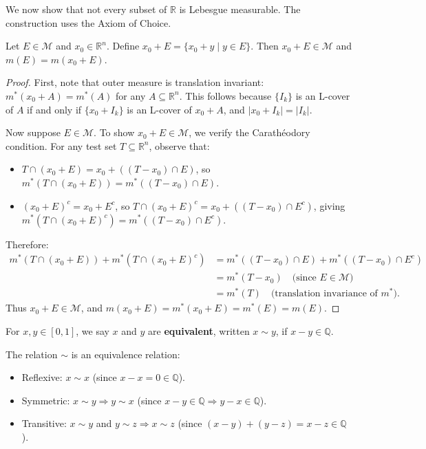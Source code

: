 \documentclass[11pt]{report}
\begin{document}
We now show that not every subset of $\mathbb{R}$ is Lebesgue measurable. The construction uses the Axiom of Choice.

\begin{lembox}
Let $E \in \mathcal{M}$ and $x_0 \in \mathbb{R}^n$. Define $x_0 + E = \{x_0 + y \mid y \in E\}$. Then $x_0 + E \in \mathcal{M}$ and $m(E) = m(x_0 + E)$.
\end{lembox}

\begin{proof}
First, note that outer measure is translation invariant: $m^*(x_0 + A) = m^*(A)$ for any $A \subseteq \mathbb{R}^n$. This follows because $\{I_k\}$ is an L-cover of $A$ if and only if $\{x_0 + I_k\}$ is an L-cover of $x_0 + A$, and $|x_0 + I_k| = |I_k|$.

Now suppose $E \in \mathcal{M}$. To show $x_0 + E \in \mathcal{M}$, we verify the Carath\'{e}odory condition. For any test set $T \subseteq \mathbb{R}^n$, observe that:
\begin{itemize}
    \item $T \cap (x_0 + E) = x_0 + ((T - x_0) \cap E)$, so $m^*(T \cap (x_0 + E)) = m^*((T - x_0) \cap E)$.
    \item $(x_0 + E)^c = x_0 + E^c$, so $T \cap (x_0 + E)^c = x_0 + ((T - x_0) \cap E^c)$, giving $m^*(T \cap (x_0 + E)^c) = m^*((T - x_0) \cap E^c)$.
\end{itemize}

Therefore:
\begin{align*}
m^*(T \cap (x_0 + E)) + m^*(T \cap (x_0 + E)^c) &= m^*((T - x_0) \cap E) + m^*((T - x_0) \cap E^c) \\
&= m^*(T - x_0) \quad \text{(since } E \in \mathcal{M}) \\
&= m^*(T) \quad \text{(translation invariance of } m^*).
\end{align*}
Thus $x_0 + E \in \mathcal{M}$, and $m(x_0 + E) = m^*(x_0 + E) = m^*(E) = m(E)$.
\end{proof}

\begin{defbox}
For $x, y \in [0, 1]$, we say $x$ and $y$ are \textbf{equivalent}, written $x \sim y$, if $x - y \in \mathbb{Q}$.
\end{defbox}

\begin{propbox}
The relation $\sim$ is an equivalence relation:
\begin{itemize}
    \item Reflexive: $x \sim x$ (since $x - x = 0 \in \mathbb{Q}$).
    \item Symmetric: $x \sim y \Rightarrow y \sim x$ (since $x - y \in \mathbb{Q} \Rightarrow y - x \in \mathbb{Q}$).
    \item Transitive: $x \sim y$ and $y \sim z \Rightarrow x \sim z$ (since $(x-y) + (y-z) = x - z \in \mathbb{Q}$).
\end{itemize}
\end{propbox}
\end{document}

